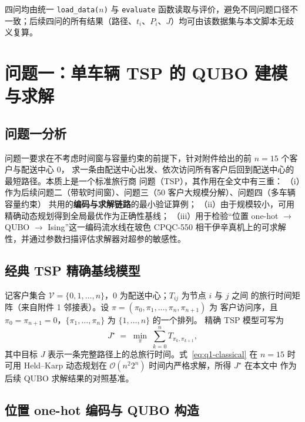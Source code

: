 \documentclass[UTF8,12pt,a4paper]{ctexart}
\begin{document}
四问均由统一 \texttt{load\_data($n$)} 与 \texttt{evaluate} 函数读取与评价，避免不同问题口径不一致；后续四问的所有结果（路径、$t_i$、$P_i$、$J$）均可由该数据集与本文脚本无歧义复算。

\section{问题一：单车辆 TSP 的 QUBO 建模与求解}
\label{sec:q1}

\subsection{问题一分析}

问题一要求在不考虑时间窗与容量约束的前提下，针对附件给出的前 $n=15$ 个客户与配送中心 0，
求一条由配送中心出发、依次访问所有客户后回到配送中心的最短路径。本质上是一个标准旅行商
问题（TSP），其作用在全文中有三重：
（i）作为后续问题二（带软时间窗）、问题三（50 客户大规模分解）、问题四（多车辆容量约束）
共用的\textbf{编码与求解链路}的最小验证算例；
（ii）由于规模较小，可用精确动态规划得到全局最优作为正确性基线；
（iii）用于检验``位置 one-hot $\to$ QUBO $\to$ Ising''这一编码流水线在玻色 CPQC-550
相干伊辛真机上的可求解性，并通过参数扫描评估求解器对超参的敏感性。

\subsection{经典 TSP 精确基线模型}

记客户集合 $\mathcal{V}=\{0,1,\dots,n\}$，0 为配送中心；$T_{ij}$ 为节点 $i$ 与 $j$ 之间
的旅行时间矩阵（来自附件 1 邻接表）。设 $\pi=(\pi_0,\pi_1,\dots,\pi_n,\pi_{n+1})$ 为
客户访问序，且 $\pi_0=\pi_{n+1}=0$，$\{\pi_1,\dots,\pi_n\}$ 为 $\{1,\dots,n\}$ 的一个排列。
精确 TSP 模型可写为
\begin{equation}
\label{eq:q1-classical}
J^{\star} \;=\; \min_{\pi}\; \sum_{k=0}^{n} T_{\pi_k,\pi_{k+1}},
\end{equation}
其中目标 $J$ 表示一条完整路径上的总旅行时间。式~\eqref{eq:q1-classical} 在 $n=15$ 时可用
Held--Karp 动态规划在 $\mathcal{O}(n^2 2^n)$ 时间内严格求解，所得 $J^{\star}$ 在本文中
作为后续 QUBO 求解结果的对照基准。

\subsection{位置 one-hot 编码与 QUBO 构造}
\label{subsec:q1-qubo}
\end{document}
